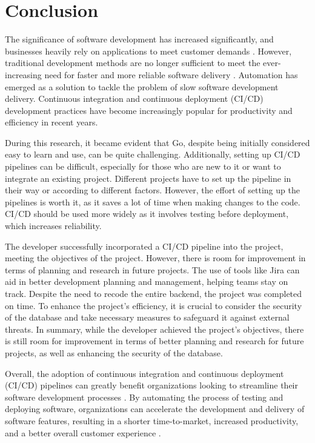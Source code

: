 \chapter{Conclusion}
The significance of software development has increased significantly, and businesses heavily rely on applications to meet customer demands \cite{hf}. However, traditional development methods are no longer sufficient to meet the ever-increasing need for faster and more reliable software delivery \cite{sb}. Automation has emerged as a solution to tackle the problem of slow software development delivery. Continuous integration and continuous deployment (CI/CD) development practices have become increasingly popular for productivity and efficiency in recent years.

During this research, it became evident that Go, despite being initially considered easy to learn and use, can be quite challenging. Additionally, setting up CI/CD pipelines can be difficult, especially for those who are new to it or want to integrate an existing project. Different projects have to set up the pipeline in their way or according to different factors. However, the effort of setting up the pipelines is worth it, as it saves a lot of time when making changes to the code. CI/CD should be used more widely as it involves testing before deployment, which increases reliability.

The developer successfully incorporated a CI/CD pipeline into the project, meeting the objectives of the project. However, there is room for improvement in terms of planning and research in future projects. The use of tools like Jira can aid in better development planning and management, helping teams stay on track. Despite the need to recode the entire backend, the project was completed on time. To enhance the project's efficiency, it is crucial to consider the security of the database and take necessary measures to safeguard it against external threats. In summary, while the developer achieved the project's objectives, there is still room for improvement in terms of better planning and research for future projects, as well as enhancing the security of the database.

Overall, the adoption of continuous integration and continuous deployment (CI/CD) pipelines can greatly benefit organizations looking to streamline their software development processes \cite{kubinyi}. By automating the process of testing and deploying software, organizations can accelerate the development and delivery of software features, resulting in a shorter time-to-market, increased productivity, and a better overall customer experience \cite{kubinyi}. 

